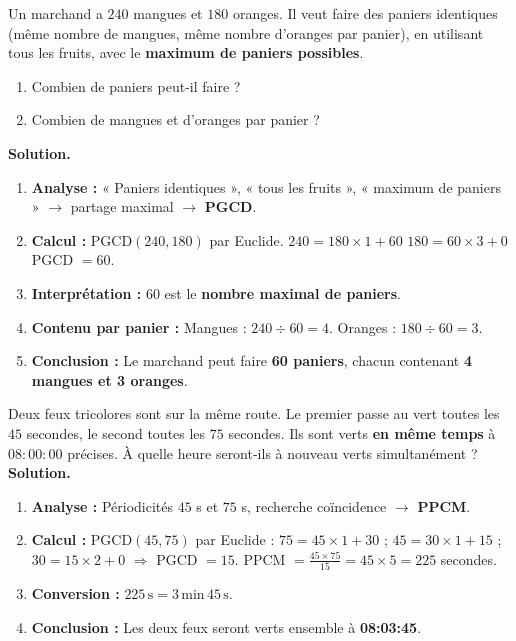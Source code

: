 \documentclass[11pt]{article}
\begin{document}
\begin{exoresolu}
Un marchand a $240$ mangues et $180$ oranges. Il veut faire des paniers identiques (même nombre de mangues, même nombre d'oranges par panier), en utilisant tous les fruits, avec le \textbf{maximum de paniers possibles}.
\begin{enumerate}
\item Combien de paniers peut-il faire ?
\item Combien de mangues et d'oranges par panier ?
\end{enumerate}
\tcblower
\textbf{Solution.}
\begin{enumerate}
\item \textbf{Analyse :} « Paniers identiques », « tous les fruits », « maximum de paniers » $\rightarrow$ partage maximal $\rightarrow$ \textbf{PGCD}.
\item \textbf{Calcul :} PGCD$(240,180)$ par Euclide.
$240 = 180 \times 1 + 60$
$180 = 60 \times 3 + 0$
PGCD $= 60$.
\item \textbf{Interprétation :} $60$ est le \textbf{nombre maximal de paniers}.
\item \textbf{Contenu par panier :} Mangues : $240 \div 60 = 4$. Oranges : $180 \div 60 = 3$.
\item \textbf{Conclusion :} Le marchand peut faire \textbf{60 paniers}, chacun contenant \textbf{4 mangues et 3 oranges}.
\end{enumerate}
\end{exoresolu}

\begin{exoresolu}
Deux feux tricolores sont sur la même route. Le premier passe au vert toutes les $45$ secondes, le second toutes les $75$ secondes. Ils sont verts \textbf{en même temps} à $08{:}00{:}00$ précises. À quelle heure seront-ils à nouveau verts simultanément ?
\tcblower
\textbf{Solution.}
\begin{enumerate}
\item \textbf{Analyse :} Périodicités $45$ s et $75$ s, recherche coïncidence $\rightarrow$ \textbf{PPCM}.
\item \textbf{Calcul :} PGCD$(45,75)$ par Euclide : $75=45\times1+30$ ; $45=30\times1+15$ ; $30=15\times2+0$ $\Rightarrow$ PGCD $=15$.
PPCM $= \frac{45\times75}{15} = 45\times5 = 225$ secondes.
\item \textbf{Conversion :} $225\,\text{s} = 3\,\text{min}\,45\,\text{s}$.
\item \textbf{Conclusion :} Les deux feux seront verts ensemble à \textbf{08{:}03{:}45}.
\end{enumerate}
\end{exoresolu}
\end{document}
